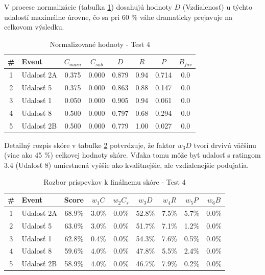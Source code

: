 \documentclass[12pt,a4paper]{article}
\begin{document}
V procese normalizácie (tabuľka \ref{tab:norm_test4}) dosahujú hodnoty $D$ (Vzdialenosť) u týchto udalostí maximálne úrovne, čo sa pri 60 \% váhe dramaticky prejavuje na celkovom výsledku.

\begin{table}[H]
\centering
\small
\begin{tabular}{|c|l|c|c|c|c|c|c|}
\hline
\textbf{\#} & \textbf{Event} & $C_{main}$ & $C_{sub}$ & $D$ & $R$ & $P$ & $B_{fav}$ \\
\hline
1 & Udalosť 2A & 0.375 & 0.000 & 0.879 & 0.94 & 0.714 & 0.0 \\
2 & Udalosť 5  & 0.375 & 0.000 & 0.863 & 0.88 & 0.147 & 0.0 \\
3 & Udalosť 1  & 0.050 & 0.000 & 0.905 & 0.94 & 0.061 & 0.0 \\
4 & Udalosť 8  & 0.500 & 0.000 & 0.797 & 0.68 & 0.294 & 0.0 \\
5 & Udalosť 2B & 0.500 & 0.000 & 0.779 & 1.00 & 0.027 & 0.0 \\
\hline
\end{tabular}
\caption{Normalizované hodnoty - Test 4}
\label{tab:norm_test4}
\end{table}

Detailný rozpis skóre v tabuľke \ref{tab:vysledky_test4} potvrdzuje, že faktor $w_3 D$ tvorí drvivú väčšinu (viac ako 45 \%) celkovej hodnoty skóre. Vďaka tomu môže byť udalosť s ratingom 3.4 (Udalosť 8) umiestnená vyššie ako kvalitnejšie, ale vzdialenejšie podujatia.

\begin{table}[H]
\centering
\small
\begin{tabular}{|c|l|c|c|c|c|c|c|c|}
\hline
\textbf{\#} & \textbf{Event} & \textbf{Score} & $w_1 C$ & $w_2 C_s$ & $w_3 D$ & $w_4 R$ & $w_5 P$ & $w_6 B$ \\
\hline
1 & Udalosť 2A & 68.9\% & 3.0\% & 0.0\% & 52.8\% & 7.5\% & 5.7\% & 0.0\% \\
2 & Udalosť 5  & 63.0\% & 3.0\% & 0.0\% & 51.7\% & 7.1\% & 1.2\% & 0.0\% \\
3 & Udalosť 1  & 62.8\% & 0.4\% & 0.0\% & 54.3\% & 7.6\% & 0.5\% & 0.0\% \\
4 & Udalosť 8  & 59.6\% & 4.0\% & 0.0\% & 47.8\% & 5.5\% & 2.4\% & 0.0\% \\
5 & Udalosť 2B & 58.9\% & 4.0\% & 0.0\% & 46.7\% & 7.9\% & 0.2\% & 0.0\% \\
\hline
\end{tabular}
\caption{Rozbor príspevkov k finálnemu skóre - Test 4}
\label{tab:vysledky_test4}
\end{table}
\end{document}
